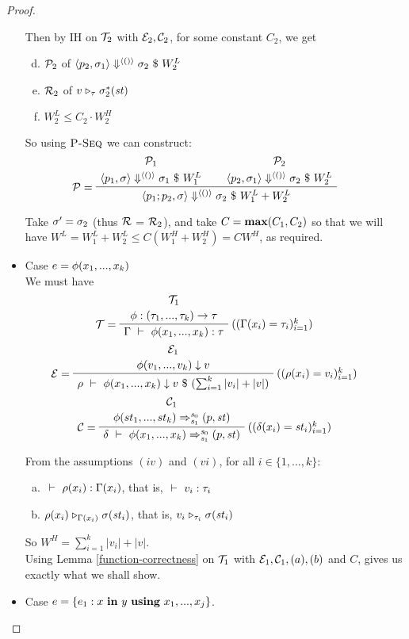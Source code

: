 \begin{proof}
\begin{itemize}
Then by IH on  $\mathcal{T}_2$ with $\mathcal{E}_2,\mathcal{C}_2$, for some constant $C_2$, we get 
\begin{enumerate}	[(a)]
	\setcounter{enumi}{3}
	\item $\mathcal{P}_2$ of $\left\langle p_2,\sigma_1 \right\rangle \Downarrow^{\langle () \rangle} \sigma_2 \ \$ \ W^L_2$ 
	\item $\mathcal{R}_2$ of $ v \mathrel{\triangleright_{\tau}} \sigma_2^*(\mathit{st})$
    \item $W^L_2 \le C_2 \cdot W^H_2 $
\end{enumerate}

So using $\textsc{P-Seq}$ we can construct:  
$$\PT{
	\UCN{\MP_1}{\seval{p_1}{\sgm}{\vunit}{\sgm_1}{W^L_1}}
	\UCN{\MP_2}{\seval{p_2}{\sgm_1}{\vunit}{\sgm_2}{W^L_2}}
	\LeLa{\MP = }	
	\BC{\seval{p_1;p_2}{\sgm}{\vunit}{\sgm_2}{W^L_1+W^L_2}}
}$$


Take $\sigma' = \sigma_2$ (thus $\mathcal{R}$ = $\mathcal{R}_2$),  and take $C =\mathbf{max}(C_1,C_2)$ so that we will have $W^L=W^L_1+W^L_2 \le C(W^H_1+W^H_2) = CW^H$, as required.



\item Case $e = \phi(x_1,...,x_k)$ \\
We must have  
$$\PT{
	\UCN{\MT_1}{\Typef {\hcall} {\replc{k}{\tau}} {\tau}}
	\LeLa{\MT = }
	\RiLa{((\Gam(x_i)= \tau_i)^k_{i=1})}
	\UC{\Type{\Gam}{\hcall{\Tupk{x}}}{\tau}}
}$$
$$\PT{
	\UCN{\ME_1}{\EvalF{\hcall}{v_1,...,v_k}{v}}
	\LeLa{\ME = }
	\RiLa{((\rho(x_i)=v_i)^k_{i=1})}
	\UC{\Eval{\rho}{\hcall{\Tupk{x}}}{v}{(\sum_{i=1}^{k}|v_i| +|v| )}}
}$$
$$\PT{
	\UCN{\MC_1}{\Transf{\hcall}{\replc{k}{st}}{\s_0}{\s_1}{\sfun{p}{\st}}}
	\LeLa{\MC =}
	\RiLa{((\del(x_i)=\st_i)^k_{i=1})}
	\UC{\Trans{\del}{\hcall \Tupk{x}}{\s_0}{\s_1}{\sfun{p}{\st}}}
}$$

From the assumptions $(iv)$ and $(vi)$, for all $i \in \{1,...,k\}$:
\begin{enumerate}[(a)]
	\item $\ \vdash\  \rho(x_i) : \Gamma(x_i)$, that is, $\ \vdash\  v_i : \tau_i$
	\item $\rho(x_i) \mathrel{\triangleright_{\Gamma(x_i)}} \sigma(\mathit{st}_i)$, that is,
	$v_i \mathrel{\triangleright_{\tau_i}} \sigma(\mathit{st}_i)$
\end{enumerate}

So $W^H = \sum_{i=1}^{k}|v_i| +|v|$. \\ 
Using Lemma \ref{function-correctness} on $\mathcal{T}_1$  with $\mathcal{E}_1, \mathcal{C}_1, (a),(b)$ and $C$, gives us exactly what we shall show.

		
		\item Case $e = \{e_1 : x \ \mathbf{in} \ y \ \mathbf{using} \ x_1,...,x_j\}$. \\
\def\eqnum#1{eq-mainproof-#1}  


\end{itemize}
\end{proof}
